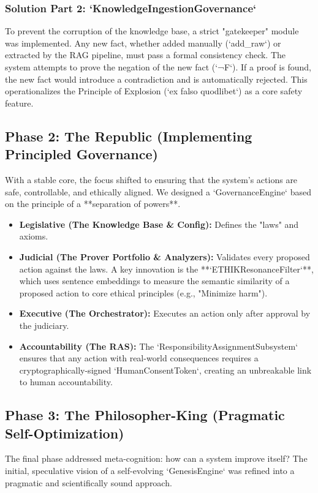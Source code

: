 \documentclass[11pt, a4paper]{article}
\begin{document}
\subsubsection{Solution Part 2: `KnowledgeIngestionGovernance`}
To prevent the corruption of the knowledge base, a strict "gatekeeper" module was implemented. Any new fact, whether added manually (`add_raw`) or extracted by the RAG pipeline, must pass a formal consistency check. The system attempts to prove the negation of the new fact (`¬F`). If a proof is found, the new fact would introduce a contradiction and is automatically rejected. This operationalizes the Principle of Explosion (`ex falso quodlibet`) as a core safety feature.

\subsection{Phase 2: The Republic (Implementing Principled Governance)}
\label{subsec:republic}
With a stable core, the focus shifted to ensuring that the system's actions are safe, controllable, and ethically aligned. We designed a `GovernanceEngine` based on the principle of a **separation of powers**.

\begin{itemize}
    \item \textbf{Legislative (The Knowledge Base \& Config):} Defines the "laws" and axioms.
    \item \textbf{Judicial (The Prover Portfolio \& Analyzers):} Validates every proposed action against the laws. A key innovation is the **`ETHIKResonanceFilter`**, which uses sentence embeddings to measure the semantic similarity of a proposed action to core ethical principles (e.g., "Minimize harm").
    \item \textbf{Executive (The Orchestrator):} Executes an action only after approval by the judiciary.
    \item \textbf{Accountability (The RAS):} The `ResponsibilityAssignmentSubsystem` ensures that any action with real-world consequences requires a cryptographically-signed `HumanConsentToken`, creating an unbreakable link to human accountability.
\end{itemize}

\subsection{Phase 3: The Philosopher-King (Pragmatic Self-Optimization)}
\label{subsec:philosopherking}
The final phase addressed meta-cognition: how can a system improve itself? The initial, speculative vision of a self-evolving `GenesisEngine` was refined into a pragmatic and scientifically sound approach.
\end{document}
